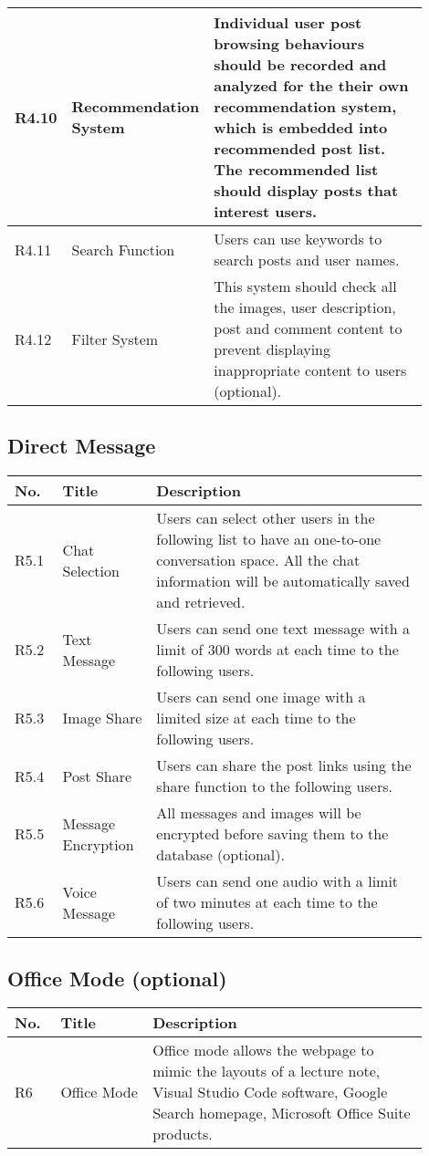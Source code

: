 \documentclass[a4paper,11pt]{scrreprt}
\begin{document}
\begin{longtable}{|>{\centering\arraybackslash}m{0.1\linewidth}|>{\centering\arraybackslash}m{0.2\linewidth}|m{0.6\linewidth}|}
 R4.10& Recommendation System&Individual user post browsing behaviours should be recorded and analyzed for the their own recommendation system, which is embedded into recommended post list. The recommended list should display posts that interest users.\\\hline
 R4.11& Search Function&Users can use keywords to search posts and user names.\\\hline
 R4.12& Filter System&This system should check all the images, user description, post and comment content to prevent displaying inappropriate content to users (optional).\\\hline
\end{longtable}

\subsection{Direct Message}
\begin{tabular}{|>{\centering\arraybackslash}m{0.1\linewidth}|>{\centering\arraybackslash}m{0.2\linewidth}|>{\raggedright\arraybackslash}m{0.6\linewidth}|} \hline
     No.&  Title&Description\\ \hline 
     R5.1&   Chat Selection&Users can select other users in the following list to have an one-to-one conversation space. All the chat information will be automatically saved and retrieved.\\ \hline 
     R5.2&   Text Message&Users can send one text message with a limit of 300 words at each time to the following users.\\ \hline 
     R5.3&   Image Share&Users can send one image with a limited size at each time to the following users.\\ \hline 
     R5.4&   Post Share&Users can share the post links using the share function to the following users.\\ \hline 
     R5.5&   Message Encryption&All messages and images will be encrypted before saving them to the database (optional). \\\hline
 R5.6& Voice Message&Users can send one audio with a limit of two minutes at each time to the following users.\\\hline
\end{tabular}

\smallskip

\subsection{Office Mode (optional)}
\begin{tabular}{|>{\centering\arraybackslash}m{0.1\linewidth}|>{\centering\arraybackslash}m{0.2\linewidth}|>{\raggedright\arraybackslash}m{0.6\linewidth}|} \hline
     No.&  Title&Description\\ \hline 
     R6&  Office Mode&Office mode allows the webpage to mimic the layouts of a lecture note, Visual Studio Code software, Google Search homepage, Microsoft Office Suite products.\\\hline
\end{tabular}
\end{document}
